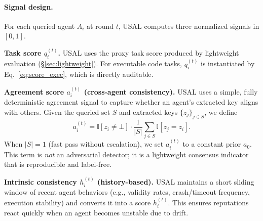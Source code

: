 \documentclass[acmsmall,screen,review,anonymous]{acmart}
\begin{document}
\paragraph{Signal design.}
For each queried agent $A_i$ at round $t$, USAL computes three normalized signals in $[0,1]$.

\textbf{Task score $q_i^{(t)}$.}
USAL uses the proxy task score produced by lightweight evaluation (\S\ref{sec:lightweight}).
For executable code tasks, $q_i^{(t)}$ is instantiated by Eq.~\ref{eq:score_exec}, which is directly auditable.

\textbf{Agreement score $a_i^{(t)}$ (cross-agent consistency).}
USAL uses a simple, fully deterministic agreement signal to capture whether an agent's extracted key aligns with others.
Given the queried set $S$ and extracted keys $\{z_j\}_{j\in S}$, we define
\[
a_i^{(t)} = \mathbb{I}[z_i\neq\bot]\cdot \frac{1}{|S|}\sum_{j\in S}\mathbb{I}[z_j=z_i].
\]
When $|S|=1$ (fast pass without escalation), we set $a_i^{(t)}$ to a constant prior $a_0$.
This term is \emph{not} an adversarial detector; it is a lightweight consensus indicator that is reproducible and label-free.


\textbf{Intrinsic consistency $h_i^{(t)}$ (history-based).}
USAL maintains a short sliding window of recent agent behaviors (e.g., validity rates, crash/timeout frequency, execution stability) and converts it into a score $h_i^{(t)}$.
This ensures reputations react quickly when an agent becomes unstable due to drift.
\end{document}
